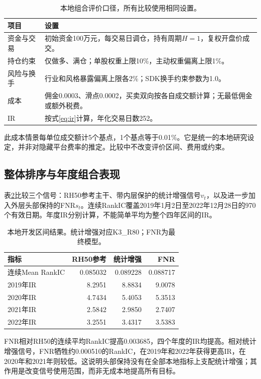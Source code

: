 \documentclass[UTF8,11pt,a4paper,fontset=fandol]{ctexart}
\begin{document}
\begin{table}[htbp]\centering\small
\caption{本地组合评价口径，所有比较使用相同设置。}\label{tab:portfolio}
\begin{tabularx}{\linewidth}{lX}\toprule
项目 & 设置\\\midrule
资金与交易 & 初始资金100万元，每交易日调仓，持有周期$H=1$，复权开盘价成交。\\
持仓约束 & 仅做多、满仓；单股权重上限10\%，主动权重偏离上限1\%。\\
风险与换手 & 行业和风格暴露偏离上限各2\%；SDK换手约束参数为1.0。\\
成本 & 佣金0.0003、滑点0.0002，买卖双向按各自成交额计算；无最低佣金或额外税费。\\
IR & 按式\eqref{eq:ir}计算，年化交易日数252。\\\bottomrule
\end{tabularx}
\end{table}

此成本情景每单位成交额计5个基点，1个基点等于0.01\%。它是统一的本地研究设定，并非对隐藏平台费率的推定。比较中不改变评价区间、费用或约束。

\subsection{整体排序与年度组合表现}
表\ref{tab:local}比较三个信号：RH50参考主干、带内层保护的统计增强信号$v_t$，以及进一步加入外层头部保持的FNR$s_t$。连续RankIC覆盖2019年1月2日至2022年12月28日的970个有效日期。年度IR分别计算，不能简单平均为整个四年区间的IR。

\begin{table}[htbp]\centering\small
\caption{本地开发区间结果。统计增强对应K3\_R80；FNR为最终模型。}\label{tab:local}
\begin{tabular}{lrrr}\toprule
指标 & RH50参考 & 统计增强 & FNR\\\midrule
连续Mean RankIC & 0.085032 & 0.089228 & 0.088717\\
2019年IR & 8.2951 & 8.8834 & 9.0078\\
2020年IR & 4.7434 & 5.4053 & 5.3513\\
2021年IR & 2.5842 & 2.9850 & 2.7407\\
2022年IR & 3.2551 & 3.4317 & 3.5383\\\bottomrule
\end{tabular}
\end{table}

FNR相对RH50的连续平均RankIC提高0.003685，四个年度的IR均提高。相对统计增强信号，FNR牺牲约0.000510的RankIC，在2019年和2022年获得更高IR，在2020年和2021年则较低。这说明头部保持没有在全部本地指标上支配统计增强；其作用是改变信号使用范围，而非无成本地提高所有目标。
\end{document}
